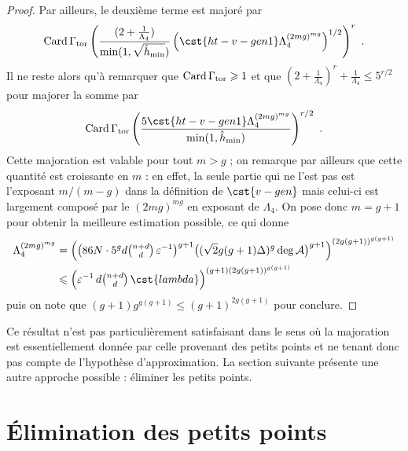 \begin{proof}
  Par ailleurs, le deuxième terme est majoré par
  \begin{equation}
    \card \Gamma_\torsion
    \left(
      \frac{
        (2 + \frac1{\Lambda_4})
      }{
        \min(1, \sqrt{\hmin})
      }
      \left(
        \cst{ht-v-gen1} \Lambda_4^{(2mg)^{mg}}
      \right)^{1/2}
    \right)^r
    \pmm.
  \end{equation}
  Il ne reste alors qu'à remarquer que \( \operatorname{Card} \Gamma_{\mathrm{tor}} \geqslant 1 \) et
  que \( (2 + \frac1{\Lambda_4})^r + \frac1{\Lambda_4} \le 5^{r/2} \) pour
  majorer la somme par
  \begin{equation}
    \card \Gamma_\torsion
    \left(
      \frac{
        5 \cst{ht-v-gen1} \Lambda_4^{(2mg)^{mg}}
      }{
        \min(1, \hmin)
      }
    \right)^{r/2}
    \pmm.
  \end{equation}
  Cette majoration est valable pour tout \( m > g \) ;
  on remarque par ailleurs que cette quantité est croissante en \( m \) :
  en effet, la seule partie qui ne l'est pas est l'exposant \( m /
    (m - g) \) dans la définition de \( \cst{v-gen} \) mais celui-ci
  est largement composé par le \( (2mg)^{mg} \) en
  exposant de \( \Lambda_4 \).  On pose donc \( m = g + 1 \) pour
  obtenir la meilleure estimation possible, ce qui donne
  \begin{align}
    \Lambda_4^{(2mg)^{mg}}
    & =
    \left(
      \bigl(
        86 \nclmaps \cdot 5^g d \sbin{n + d}{d}
        \, \eps^{-1}
      \bigr)^{ g + 1 }
      \bigl( (\sqrt2 g(g+1)\Delta)^g \deg \va \bigr)^{g+1}
    \right)^{(2g(g+1))^{g(g+1)}}
    \\ & \le
    \Bigl(
      \eps^{-1}
      \, d \sbin{n + d}{d}
      \, \cst{lambda}
    \Bigr)^{(g+1) (2g(g+1))^{g(g+1)}}
  \end{align}
  puis on note que
  \(
    (g+1) g^{g(g+1)}
    \le
    (g+1)^{2g(g+1)}
  \) pour conclure.
\end{proof}

Ce résultat n'est pas particulièrement satisfaisant dans le sens où la
majoration est essentiellement donnée par celle provenant des petits points et
ne tenant donc pas compte de l'hypothèse d'approximation. La section suivante
présente une autre approche possible : éliminer les petits points.



\section{Élimination des petits points}
\label{sec:no-small-points}

